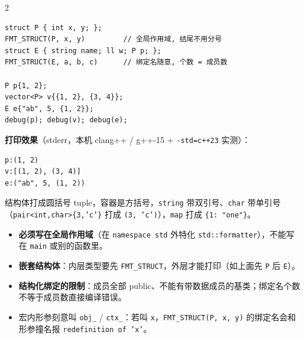 \begin{multicols*}{2}
		\begin{verbatim}
struct P { int x, y; };
FMT_STRUCT(P, x, y)         // 全局作用域, 结尾不用分号
struct E { string name; ll w; P p; };
FMT_STRUCT(E, a, b, c)      // 绑定名随意, 个数 = 成员数

P p{1, 2};
vector<P> v{{1, 2}, {3, 4}};
E e{"ab", 5, {1, 2}};
debug(p); debug(v); debug(e);
		\end{verbatim}

		\textbf{打印效果}（stderr，本机 clang++ / g++-15 + \texttt{-std=c++23} 实测）：

		\begin{verbatim}
p:(1, 2)
v:[(1, 2), (3, 4)]
e:("ab", 5, (1, 2))
		\end{verbatim}

		结构体打成圆括号 tuple，容器是方括号，\texttt{string} 带双引号、\texttt{char} 带单引号（\texttt{pair<int,char>\{3,'c'\}} 打成 \texttt{(3, 'c')}），\texttt{map} 打成 \texttt{\{1: "one"\}}。

		\begin{itemize}
			\item \textbf{必须写在全局作用域}（在 \texttt{namespace std} 外特化 \texttt{std::formatter}），不能写在 \texttt{main} 或别的函数里。
			\item \textbf{嵌套结构体}：内层类型要先 \texttt{FMT\_STRUCT}，外层才能打印（如上面先 \texttt{P} 后 \texttt{E}）。
			\item \textbf{结构化绑定的限制}：成员全部 public、不能有带数据成员的基类；绑定名个数不等于成员数直接编译错误。
			\item 宏内形参刻意叫 \texttt{obj\_} / \texttt{ctx\_}：若叫 \texttt{x}，\texttt{FMT\_STRUCT(P, x, y)} 的绑定名会和形参撞名报 \texttt{redefinition of 'x'}。
		\end{itemize}

	\end{multicols*}

